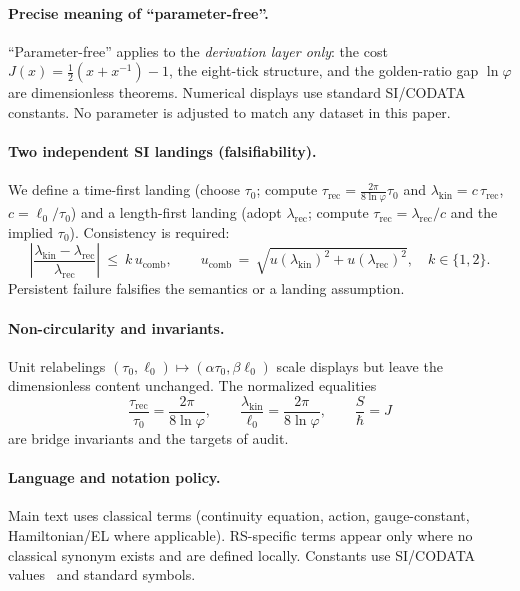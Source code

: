 \documentclass[11pt]{article}
\theoremstyle{plain}
\theoremstyle{definition}
\theoremstyle{remark}
\begin{document}
\paragraph{Precise meaning of “parameter-free”.}
“Parameter-free” applies to the \emph{derivation layer only}: the cost \(J(x)=\tfrac12(x+x^{-1})-1\), the eight-tick structure, and the golden-ratio gap \(\ln\varphi\) are dimensionless theorems. Numerical displays use standard SI/CODATA constants. No parameter is adjusted to match any dataset in this paper.

\paragraph{Two independent SI landings (falsifiability).}
We define a time-first landing (choose \(\tau_0\); compute \(\tau_{\mathrm{rec}}=\frac{2\pi}{8\ln\varphi}\tau_0\) and \(\lambda_{\mathrm{kin}}=c\,\tau_{\mathrm{rec}}\), \(c=\ell_0/\tau_0\)) and a length-first landing (adopt \(\lambda_{\mathrm{rec}}\); compute \(\tau_{\mathrm{rec}}=\lambda_{\mathrm{rec}}/c\) and the implied \(\tau_0\)). Consistency is required:
\[
\left|\frac{\lambda_{\mathrm{kin}}-\lambda_{\mathrm{rec}}}{\lambda_{\mathrm{rec}}}\right|\ \le\ k\,u_{\mathrm{comb}},\qquad
u_{\mathrm{comb}}\,=\,\sqrt{u(\lambda_{\mathrm{kin}})^2+u(\lambda_{\mathrm{rec}})^2},\quad k\in\{1,2\}.
\]
Persistent failure falsifies the semantics or a landing assumption.

\paragraph{Non-circularity and invariants.}
Unit relabelings \((\tau_0,\ell_0)\mapsto(\alpha\tau_0,\beta\ell_0)\) scale displays but leave the dimensionless content unchanged. The normalized equalities
\[
\frac{\tau_{\mathrm{rec}}}{\tau_0}=\frac{2\pi}{8\ln\varphi},\qquad
\frac{\lambda_{\mathrm{kin}}}{\ell_0}=\frac{2\pi}{8\ln\varphi},\qquad
\frac{S}{\hbar}=J
\]
are bridge invariants and the targets of audit.

\paragraph{Language and notation policy.}
Main text uses classical terms (continuity equation, action, gauge-constant, Hamiltonian/EL where applicable). RS-specific terms appear only where no classical synonym exists and are defined locally. Constants use SI/CODATA values~\cite{CODATA2018,CODATA2022,NISTSP330,NISTSP811} and standard symbols.
\end{document}
